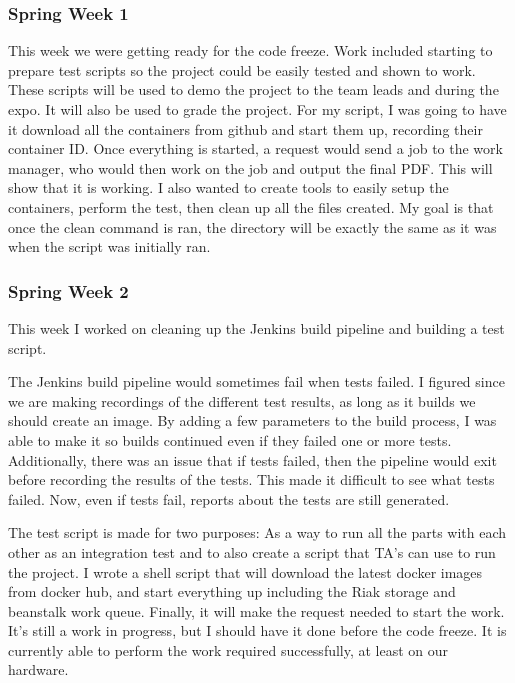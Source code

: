 \documentclass[onecolumn, draftclsnofoot,10pt, compsoc]{IEEEtran}
\begin{document}
\subsubsection*{Spring Week 1}
This week we were getting ready for the code freeze.  
Work included starting to prepare test scripts so the project could be easily tested and shown to work.
These scripts will be used to demo the project to the team leads and during the expo.  
It will also be used to grade the project.  
For my script, I was going to have it download all the containers from github and start them up, recording their container ID.  
Once everything is started, a request would send a job to the work manager, who would then work on the job and output the final PDF.
This will show that it is working.  
I also wanted to create tools to easily setup the containers, perform the test, then clean up all the files created.  
My goal is that once the clean command is ran, the directory will be exactly the same as it was when the script was initially ran.

\subsubsection*{Spring Week 2}
This week I worked on cleaning up the Jenkins build pipeline and building a test script.

The Jenkins build pipeline would sometimes fail when tests failed.
I figured since we are making recordings of the different test results, as long as it builds we should create an image.  
By adding a few parameters to the build process, I was able to make it so builds continued even if they failed one or more tests.  
Additionally, there was an issue that if tests failed, then the pipeline would exit before recording the results of the tests.  
This made it difficult to see what tests failed.  
Now, even if tests fail, reports about the tests are still generated.

The test script is made for two purposes: As a way to run all the parts with each other as an integration test and to also create a script that TA's can use to run the project.  
I wrote a shell script that will download the latest docker images from docker hub, and start everything up including the Riak storage and beanstalk work queue.  
Finally, it will make the request needed to start the work.  
It's still a work in progress, but I should have it done before the code freeze.
It is currently able to perform the work required successfully, at least on our hardware.
\end{document}
